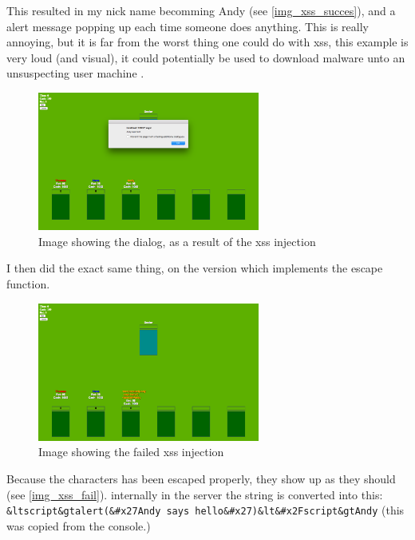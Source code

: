 \documentclass[a4paper]{article}
\begin{document}
This resulted in my nick name becomming Andy (see \autoref{img_xss_succes}), and a alert message popping up each time someone does anything. This is really annoying, but it is far from the worst thing one could do with xss, this example is very loud (and visual), it could potentially be used to download malware unto an unsuspecting user machine \cite{xss_consequences}.

\begin{figure}[H]
  \centering
  \includegraphics[width=0.65\textwidth]{images/xss_dialog}
  \caption{Image showing the dialog, as a result of the xss injection}
  \label{img_xss_succes}
\end{figure}


I then did the exact same thing, on the version which implements the escape function.

\begin{figure}[H]
  \centering
  \includegraphics[width=0.65\textwidth]{images/xss_prevented}
  \caption{Image showing the failed xss injection}
  \label{img_xss_fail}
\end{figure}

Because the characters has been escaped properly, they show up as they should (see \autoref{img_xss_fail}). internally in the server the string is converted into this: \\\texttt{\&ltscript\&gtalert(\&\#x27Andy says hello\&\#x27)\&lt\&\#x2Fscript\&gtAndy} (this was copied from the console.)
\end{document}
